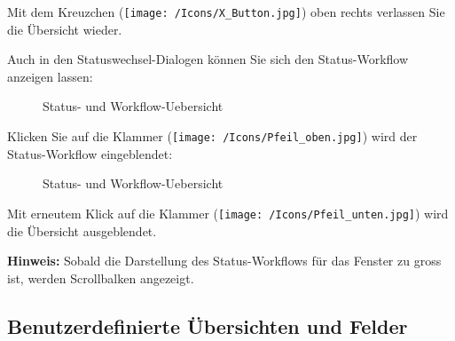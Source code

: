 Mit dem Kreuzchen (\texttt{[image: /Icons/X\_Button.jpg]}) oben rechts verlassen Sie die Übersicht wieder.

\vspace{\baselineskip}

Auch in den Statuswechsel-Dialogen können Sie sich den Status-Workflow anzeigen lassen:

\begin{figure}[H]
\caption{Status- und Workflow-Uebersicht}
\end{figure}

Klicken Sie auf die Klammer (\texttt{[image: /Icons/Pfeil\_oben.jpg]})  wird der Status-Workflow eingeblendet: 

\begin{figure}[H]
\caption{Status- und Workflow-Uebersicht}
\end{figure}

Mit erneutem Klick auf die Klammer (\texttt{[image: /Icons/Pfeil\_unten.jpg]})  wird die Übersicht ausgeblendet.

\vspace{\baselineskip}

\textbf{Hinweis:} Sobald die Darstellung des Status-Workflows für das Fenster zu gross ist, werden Scrollbalken angezeigt.


\pagebreak
\subsection{Benutzerdefinierte Übersichten und Felder}

